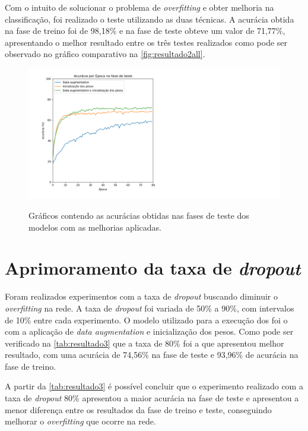 \par Com o intuito de solucionar o problema de \textit{overfitting} e obter melhoria na classificação, foi realizado o teste utilizando as duas técnicas. A acurácia obtida na fase de treino foi de 98,18\% e na fase de teste obteve um valor de 71,77\%, apresentando o melhor resultado entre os três testes realizados como pode ser observado no gráfico comparativo na \autoref{fig:resultado2all}.%
\begin{figure}[H]
  \centering
  \caption{Gráficos contendo as acurácias obtidas nas fases de teste dos modelos com as melhorias aplicadas.}
  \includegraphics[width=500pt]{dados/figuras/resultado2_all}
  \label{fig:resultado2all}
\end{figure}
 
\section{Aprimoramento da taxa de \textit{dropout}}
Foram realizados experimentos com a taxa de \textit{dropout} buscando diminuir o \textit{overfitting} na rede. A taxa de \textit{dropout} foi variada de 50\% a 90\%, com intervalos de 10\% entre cada experimento. O modelo utilizado para a execução dos foi o com a aplicação de \textit{data augmentation} e inicialização dos pesos. Como pode ser verificado na \autoref{tab:resultado3} que a taxa de 80\% foi a que apresentou melhor resultado, com uma acurácia de 74,56\% na fase de teste e 93,96\% de acurácia na fase de treino.



\par A partir da \autoref{tab:resultado3} é possível concluir que o experimento realizado com a taxa de \textit{dropout} 80\% apresentou a maior acurácia na fase de teste e apresentou a menor diferença entre os resultados da fase de treino e teste, conseguindo melhorar o \textit{overfitting} que ocorre na rede. 

